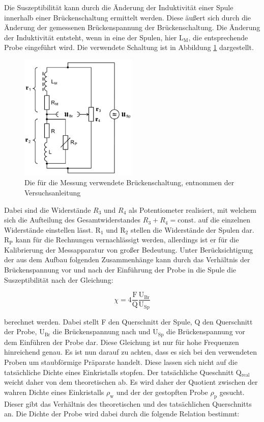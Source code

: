 Die Suszeptibilität kann durch die Änderung der Induktivität einer Spule innerhalb einer Brückenschaltung ermittelt werden.
Diese äußert sich durch die Änderung der gemessenen Brückenspannung der Brückenschaltung.
Die Änderung der Induktivität entsteht, wenn in eine der Spulen, hier L$_\text{M}$, die entsprechende Probe eingeführt wird.
Die verwendete Schaltung ist in Abbildung \ref{fig:Brückenschaltung} dargestellt.

\begin{figure}
  \centering
  \includegraphics[width=0.5\textwidth]{images/Brueckenschaltung.png}
  \caption{Die für die Messung verwendete Brückenschaltung, entnommen der Versuchsanleitung\cite[179]{sample}}
  \label{fig:Brückenschaltung}
\end{figure}

Dabei sind die Widerstände $R_3$ und $R_4$ als Potentiometer realisiert, mit welchem sich die Aufteilung des Gesamtwiderstandes $R_3 + R_4 = \text{const.}$ auf die einzelnen Widerstände
einstellen lässt.
R$_1$ und R$_2$ stellen die Widerstände der Spulen dar.
R$_\text{P}$ kann für die Rechnungen vernachlässigt werden, allerdings ist er für die Kalibrierung der Messapparatur von großer Bedeutung.
Unter Berücksichtigung der aus dem Aufbau folgenden Zusammenhänge  kann durch das Verhältnis der Brückenspannung vor und nach der Einführung der Probe in die Spule die Suszeptibilität nach der Gleichung:

\begin{equation}
  \chi = 4 \frac{\text{F}}{\text{Q}} \frac{\text{U}_\text{Br}}{\text{U}_\text{Sp}}
  \label{eqn:chi1}
\end{equation}

berechnet werden.
Dabei stellt F den Querschnitt der Spule, Q den Querschnitt der Probe, $\text{U}_\text{Br}$ die Brückenspannung nach und $\text{U}_\text{Sp}$ die Brückenspannung vor dem Einführen der Probe dar.
Diese Gleichung ist nur für hohe Frequenzen hinreichend genau.
Es ist nun darauf zu achten, dass es sich bei den verwendeten Proben um staubförmige Präparate handelt.
Diese lassen sich nicht auf die tatsächliche Dichte eines Einkristalls stopfen.
Der tatsächliche Queschnitt Q$_\text{real}$ weicht daher von dem theoretischen ab.
Es wird daher der Quotient zwischen der wahren Dichte eines Einkristalls $\rho_\text{w}$ und der der gestopften Probe $\rho_\text{p}$ gesucht.
Dieser gibt das Verhältnis des theoretischen und des tatsächlichen Querschnitts an.
Die Dichte der Probe wird dabei durch die folgende Relation bestimmt:


